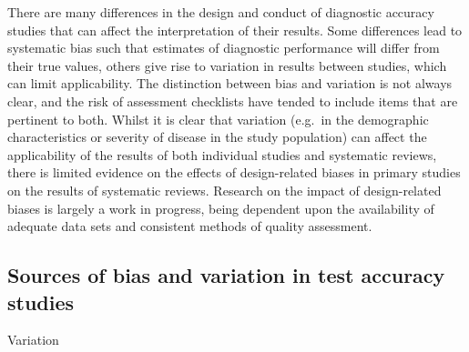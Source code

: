 \documentclass[
  11pt,
  a4paper,
  DIV=11,
  numbers=noendperiod]{scrreprt}
\begin{document}
There are many differences in the design and conduct of diagnostic
accuracy studies that can affect the interpretation of their results.
Some differences lead to systematic bias such that estimates of
diagnostic performance will differ from their true values, others give
rise to variation in results between studies, which can limit
applicability. The distinction between bias and variation is not always
clear, and the risk of assessment checklists have tended to include
items that are pertinent to both. Whilst it is clear that variation
(e.g.~in the demographic characteristics or severity of disease in the
study population) can affect the applicability of the results of both
individual studies and systematic reviews, there is limited evidence on
the effects of design-related biases in primary studies on the results
of systematic reviews. Research on the impact of design-related biases
is largely a work in progress, being dependent upon the availability of
adequate data sets and consistent methods of quality assessment.

\subsection{Sources of bias and variation in test accuracy
studies}\label{sources-of-bias-and-variation-in-test-accuracy-studies}

Variation
\end{document}
